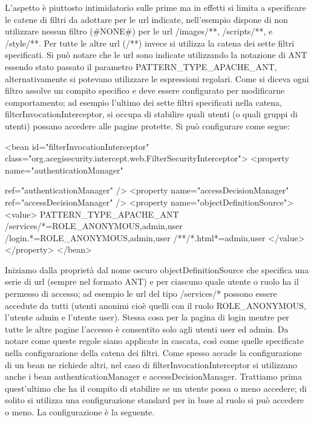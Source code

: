 L'aspetto è piuttosto intimidatorio sulle prime ma in effetti si limita a specificare le catene di filtri da adottare per le url indicate, nell'esempio dispone di non utilizzare nessun filtro (\#NONE\#) per le url /images/**, /scripts/**, e /style/**. Per tutte le altre url (/**) invece si utilizza la catena dei sette filtri specificati. Si può notare che le url sono indicate utilizzando la notazione di ANT essendo stato passato il parametro   PATTERN\_TYPE\_APACHE\_ANT, alternativamente si potevano utilizzare le espressioni regolari. 
Come si diceva ogni filtro assolve un compito specifico e deve essere configurato per modificarne comportamento; ad esempio l'ultimo dei sette filtri specificati nella catena,  filterInvocationInterceptor, si occupa di stabilire quali utenti (o quali gruppi di utenti) possano accedere alle pagine protette. Si può configurare come segue:

\begin{xml}
<bean id="filterInvocationInterceptor"
  class="org.acegisecurity.intercept.web.FilterSecurityInterceptor">
  <property name="authenticationManager"
 
                  ref="authenticationManager" />
  <property name="accessDecisionManager"
        ref="accessDecisionManager" />
  <property name="objectDefinitionSource">
    <value>
    PATTERN_TYPE_APACHE_ANT
    /services/*=ROLE_ANONYMOUS,admin,user
    /login.*=ROLE_ANONYMOUS,admin,user
    /**/*.html*=admin,user
    </value>
  </property>
</bean>
\end{xml}

Iniziamo dalla proprietà dal nome oscuro  objectDefinitionSource che specifica una serie di url (sempre nel formato ANT) e per ciascuno quale utente o ruolo ha il permesso di accesso; ad esempio le url del tipo /services/* possono essere accedute da tutti (utenti anonimi cioè quelli con il ruolo ROLE\_ANONYMOUS, l'utente admin e l'utente user). Stessa cosa per la pagina di login mentre per tutte le altre pagine l'accesso è consentito solo agli utenti user ed admin. Da notare come queste regole siano applicate in cascata, così come quelle specificate nella configurazione della catena dei filtri. 
Come spesso accade la configurazione di un bean ne richiede altri, nel caso di   filterInvocationInterceptor si utilizzano anche i bean  authenticationManager e  accessDecisionManager. Trattiamo prima quest'ultimo che ha il compito di stabilire  se un utente possa o meno accedere; di solito si utilizza una configurazione standard per in base al ruolo si può accedere o meno. La configurazione è la seguente.

